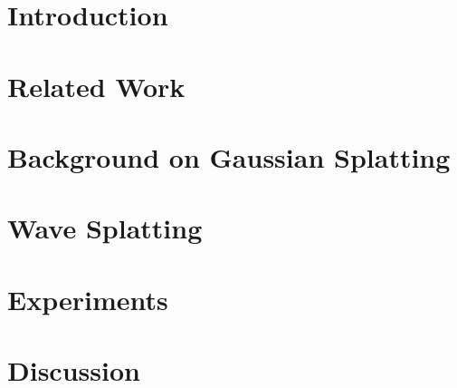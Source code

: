 \documentclass[acmtog,nonacm]{acmart}
\begin{document}
\maketitle


\section{Introduction}


\section{Related Work}


\section{Background on Gaussian Splatting}


\section{Wave Splatting}


% 

\section{Experiments}
\label{sec:results}


\section{Discussion}

\end{document}
